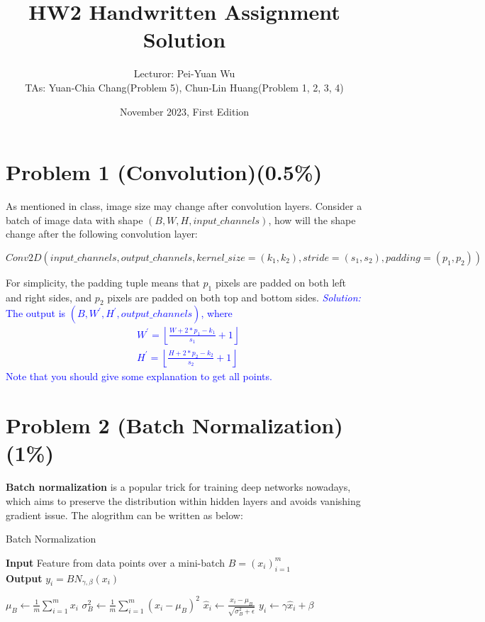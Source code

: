 \documentclass{article}
\title{HW2 Handwritten Assignment Solution}
\author{Lecturor: Pei-Yuan Wu\\
TAs: {Yuan-Chia Chang(Problem 5), Chun-Lin Huang(Problem 1, 2, 3, 4)}}
\date{November 2023, First Edition}
\def\solColor{blue}
\begin{document}
\maketitle

\section*{Problem 1 (Convolution)(0.5\%)}
As mentioned in class, image size may change after convolution layers. Consider a batch of image data with shape $(B, W, H, input\_channels)$, how will the shape change after the following convolution layer:
\begin{footnotesize}
\begin{equation*}
Conv2D \left( input\_channels, output\_channels, kernel\_size=(k_1,k_2), stride=(s_1,s_2), padding=(p_1,p_2) \right)
\end{equation*}
\end{footnotesize}
%
For simplicity, the padding tuple means that $p_1$ pixels are padded on both left and right sides, and $p_2$ pixels are padded on both top and bottom sides.
\textcolor{\solColor}{\textit{Solution:}
The output is $(B, W^\prime, H^\prime, output\_channels)$, where
$$
\begin{aligned}
&W^{\prime}=\left\lfloor\frac{W+2 * p_1-k_1}{s_1}+1\right\rfloor \\
&H^{\prime}=\left\lfloor\frac{H+2 * p_2-k_2}{s_2}+1\right\rfloor
\end{aligned}
$$
Note that you should give some explanation to get all points.}

\newpage
\section*{Problem 2 (Batch Normalization)(1\%)}
{\bf Batch normalization}\cite{Ioffe2015} is a popular trick for training deep networks nowadays, which aims to preserve the distribution within hidden layers and avoids vanishing gradient issue.  The alogrithm can be written as below:
\begin{algorithm}
  \caption{Batch Normalization}
  \label{alg:batch_normalization}
  \hspace*{\algorithmicindent} \textbf{Input} Feature from data points over a mini-batch $B = (x_i)_{i=1}^m$\\
  \hspace*{\algorithmicindent} \textbf{Output} $y_i = {BN}_{\gamma,\beta}(x_i)$
  \begin{algorithmic}[1]
    \State $\mu_B \gets \frac{1}{m}\sum_{i=1}^m x_i$ 					
    \State $\sigma^2_B \gets \frac{1}{m}\sum_{i=1}^m (x_i-\mu_B)^2$ 		
      \State ${\hat x}_i \gets \frac{x_i-\mu_B}{\sqrt{\sigma_{B}^{2}+\epsilon}}$ 	
      \State $y_i \gets \gamma {\hat x}_i + \beta$ 							
    \EndFor
    \State \Return 
    \EndProcedure
   \end{algorithmic}
\end{algorithm}
%
\end{document}
